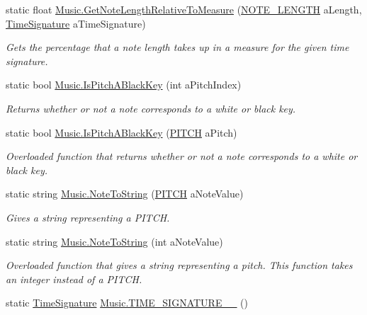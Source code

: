 \begin{DoxyCompactItemize}
static float \hyperlink{group___music_stat_func_ga91e290b48ad2289493ba4421308abe49}{Music.\+Get\+Note\+Length\+Relative\+To\+Measure} (\hyperlink{group___music_enums_gaf11b5f079adbb21c800b9eca1c5c3cbd}{N\+O\+T\+E\+\_\+\+L\+E\+N\+G\+TH} a\+Length, \hyperlink{group___music_structs_struct_music_1_1_time_signature}{Time\+Signature} a\+Time\+Signature)
\begin{DoxyCompactList}\small\item\em Gets the percentage that a note length takes up in a measure for the given time signature. \end{DoxyCompactList}\item 
static bool \hyperlink{group___music_stat_func_gacc2c1a66df7197225f61c5737f794065}{Music.\+Is\+Pitch\+A\+Black\+Key} (int a\+Pitch\+Index)
\begin{DoxyCompactList}\small\item\em Returns whether or not a note corresponds to a white or black key. \end{DoxyCompactList}\item 
static bool \hyperlink{group___music_stat_func_ga4c91d4a78702a5c16e833af6585b9e19}{Music.\+Is\+Pitch\+A\+Black\+Key} (\hyperlink{group___music_enums_ga508f69b199ea518f935486c990edac1d}{P\+I\+T\+CH} a\+Pitch)
\begin{DoxyCompactList}\small\item\em Overloaded function that returns whether or not a note corresponds to a white or black key. \end{DoxyCompactList}\item 
static string \hyperlink{group___music_stat_func_ga85a22c905d56d4c5f4e62159bfecee8c}{Music.\+Note\+To\+String} (\hyperlink{group___music_enums_ga508f69b199ea518f935486c990edac1d}{P\+I\+T\+CH} a\+Note\+Value)
\begin{DoxyCompactList}\small\item\em Gives a string representing a P\+I\+T\+CH. \end{DoxyCompactList}\item 
static string \hyperlink{group___music_stat_func_ga03f793951dcfe199532c9596cb539022}{Music.\+Note\+To\+String} (int a\+Note\+Value)
\begin{DoxyCompactList}\small\item\em Overloaded function that gives a string representing a pitch. This function takes an integer instead of a P\+I\+T\+CH. \end{DoxyCompactList}\item 
static \hyperlink{group___music_structs_struct_music_1_1_time_signature}{Time\+Signature} \hyperlink{group___music_stat_func_gac95af323eef7511543c799154e1c29fd}{Music.\+T\+I\+M\+E\+\_\+\+S\+I\+G\+N\+A\+T\+U\+R\+E\+\_\+\_} ()

\end{DoxyCompactItemize}
